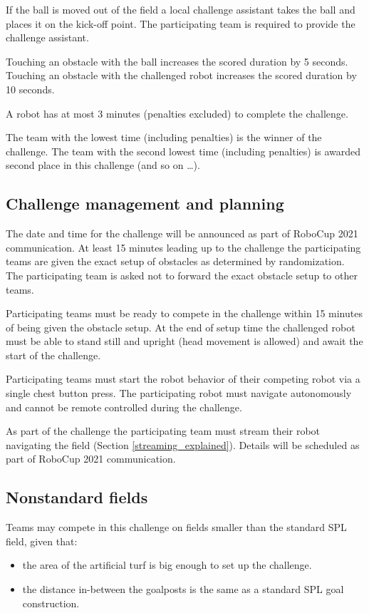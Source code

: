 If the ball is moved out of the field a local challenge assistant takes the ball and places it on the kick-off point. The participating team is required to provide the challenge assistant.

Touching an obstacle with the ball increases the scored duration by 5 seconds. Touching an obstacle with the challenged robot increases the scored duration by 10 seconds.

A robot has at most 3 minutes (penalties excluded) to complete the challenge.

The team with the lowest time (including penalties) is the winner of the challenge. The team with the second lowest time (including penalties) is awarded second place in this challenge (and so on \ldots).

\subsection{Challenge management and planning}

The date and time for the challenge will be announced as part of RoboCup 2021 communication. At least 15 minutes leading up to the challenge the participating teams are given the exact setup of obstacles as determined by randomization. The participating team is asked not to forward the exact obstacle setup to other teams.

Participating teams must be ready to compete in the challenge within 15 minutes of being given the obstacle setup. At the end of setup time the challenged robot must be able to stand still and upright (head movement is allowed) and await the start of the challenge.

Participating teams must start the robot behavior of their competing robot via a single chest button press. The participating robot must navigate autonomously and cannot be remote controlled during the challenge.

As part of the challenge the participating team must stream their robot navigating the field (\cf Section \ref{streaming_explained}). Details will be scheduled as part of RoboCup 2021 communication.

\subsection{Nonstandard fields}

Teams may compete in this challenge on fields smaller than the standard SPL field, given that:

\begin{itemize}
	\item the area of the artificial turf is big enough to set up the challenge.
	\item the distance in-between the goalposts is the same as a standard SPL goal construction.
\end{itemize}

